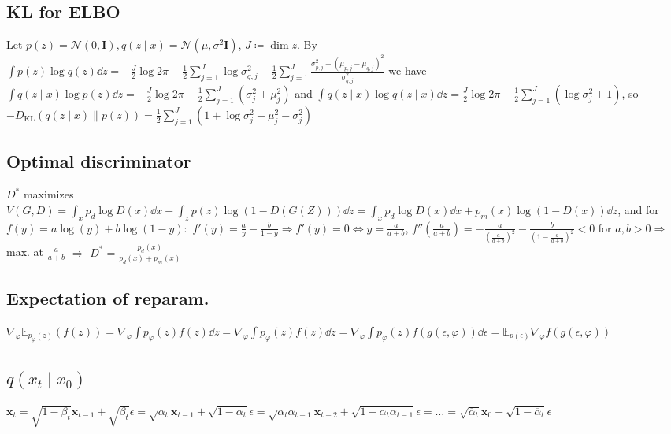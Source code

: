 \documentclass[11pt,landscape,a4paper,fleqn]{article}
\newcommand{\kl}[2]{D_{\mathrm{KL}}(#1\lVert#2)}
\newcommand{\E}{\mathbb{E}}
\def\myvector#1{\mathbf{#1}}
\def\vx{{\myvector{x}}}
\def\mymatrix#1{\mathbf{#1}}
\def\mI{{\mymatrix{I}}}
\begin{document}
\begin{multicols*}{4}
\subsection*{KL for ELBO} Let $p(z) = \mathcal{N}(0, \mI), q(z\mid x) = \mathcal{N}(\mu, \sigma^2 \mI)$, $J \coloneqq \dim z$.
By $\int p(z) \log q(z) \dd z = - \frac{J}{2} \log 2\pi - \frac{1}{2} \sum_{j = 1}^J \log\sigma^2_{q, j}
- \frac{1}{2} \sum_{j = 1}^J \frac{\sigma_{p, j}^2 + (\mu_{p, j} - \mu_{q, j})^2}{\sigma^2_{q, j}}$
we have $\int q(z\mid x) \log p(z) \dd z = - \frac{J}{2} \log 2\pi - \frac{1}{2} \sum_{j = 1}^J(\sigma_j^2 + \mu_j^2)$
and $\int q(z\mid x) \log q(z\mid x) \dd z = \frac{J}{2} \log 2\pi - \frac{1}{2} \sum_{j = 1}^J(\log \sigma_j^2 + 1)$,
so $ - \kl{q(z\mid x)}{p(z)} = \frac{1}{2} \sum_{j = 1}^J (1 + \log \sigma_j^2 - \mu_j^2 - \sigma_j^2)$

\subsection*{Optimal discriminator} $D^*$ maximizes $V(G, D) = \int_x p_d \log D(x) \dd x + \int_z p(z) \log(1 - D(G(Z))) \dd z
= \int_x p_d \log D(x) \dd x + p_m(x) \log(1 - D(x)) \dd z$,
and for $f(y) = a\log(y) + b\log(1 - y):$
$f'(y) = \frac{a}{y} - \frac{b}{1 - y} \Rightarrow f'(y) = 0 \Leftrightarrow y = \frac{a}{a + b}$,
$f''(\frac{a}{a + b}) = - \frac{a}{\left(\frac{a}{a + b}\right)^2} - \frac{b}{\left(1 - \frac{a}{a + b}\right)^2} < 0$
for $a, b > 0 \Rightarrow $ max. at $\frac{a}{a + b}$ $\Rightarrow$ $D^* = \frac{p_d(x)}{p_d(x) + p_m(x)}$

\subsection*{Expectation of reparam.}

\!\!$\nabla_\varphi \E_{p_\varphi(z)}(f(z)) = \nabla_\varphi \int p_\varphi(z) f(z) \dd z
= \nabla_\varphi\! \int\!\! p_\varphi(z) f(z) \dd z \!=\! \nabla_\varphi\! \int\!\! p_\varphi(z) f(g(\epsilon, \varphi)) \dd \epsilon
\!=\! \E_{p(\epsilon)}\! \nabla_\varphi f(g(\epsilon, \varphi))$

\subsection*{$q(x_t \mid x_0)$}
$\vx_t = \sqrt{1 - \beta_t} \vx_{t-1} + \sqrt{\beta_t} \epsilon
= \sqrt{\alpha_t} \vx_{t-1} + \sqrt{1 - \alpha_t} \epsilon
= \sqrt{\alpha_t \alpha_{t - 1}} \vx_{t-2} + \sqrt{1 - \alpha_t \alpha_{t - 1}} \epsilon
= \dots = \sqrt{\overline{\alpha}_t} \vx_0 + \sqrt{1 - \overline{\alpha}_t} \epsilon$


\end{multicols*}
\end{document}
